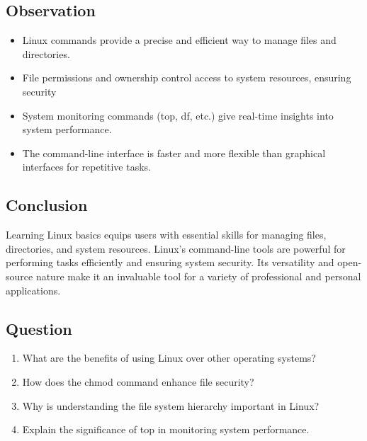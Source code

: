 \documentclass[a4paper,9pt]{article}
\begin{document}
\subsection{Observation}
\begin{itemize}
	\item Linux commands provide a precise and efficient way to manage files and directories.
	
	\item File permissions and ownership control access to system resources, ensuring security
	\item System monitoring commands (top, df, etc.) give real-time insights into system performance.
	\item The command-line interface is faster and more flexible than graphical interfaces for repetitive tasks.
\end{itemize}
\subsection{Conclusion}
Learning Linux basics equips users with essential skills for managing files, directories, and system resources. Linux's command-line tools are powerful for performing tasks efficiently and ensuring system security. Its versatility and open-source nature make it an invaluable tool for a variety of professional and personal applications.

\subsection{Question}

\begin{enumerate}
	\item What are the benefits of using Linux over other operating systems?
	\item How does the chmod command enhance file security? 
	\item Why is understanding the file system hierarchy important in Linux?
	\item Explain the significance of top in monitoring system performance.
	
\end{enumerate}

\newpage		


\end{document}
